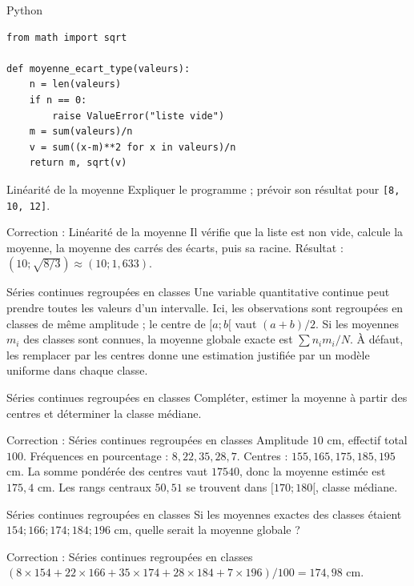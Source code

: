 \documentclass[aspectratio=169,10pt]{beamer}
\begin{document}
\begin{frame}[fragile]{Python}
\small
\begin{verbatim}
from math import sqrt

def moyenne_ecart_type(valeurs):
    n = len(valeurs)
    if n == 0:
        raise ValueError("liste vide")
    m = sum(valeurs)/n
    v = sum((x-m)**2 for x in valeurs)/n
    return m, sqrt(v)
\end{verbatim}
\end{frame}
\begin{frame}{Linéarité de la moyenne}
Expliquer le programme ; prévoir son résultat pour \texttt{[8, 10, 12]}.
\end{frame}
\begin{frame}{Correction : Linéarité de la moyenne}
Il vérifie que la liste est non vide, calcule la moyenne, la moyenne des carrés des écarts, puis sa racine. Résultat : \((10;\sqrt{8/3})\approx(10;1{,}633)\).
\end{frame}
\begin{frame}{Séries continues regroupées en classes}
Une variable quantitative continue peut prendre toutes les valeurs d'un intervalle. Ici, les observations sont regroupées en classes de même amplitude ; le centre de \([a;b[\) vaut \((a+b)/2\).
Si les moyennes \(m_i\) des classes sont connues, la moyenne globale exacte est \(\sum n_im_i/N\). À défaut, les remplacer par les centres donne une estimation justifiée par un modèle uniforme dans chaque classe.
\end{frame}
\begin{frame}{Séries continues regroupées en classes}
Compléter, estimer la moyenne à partir des centres et déterminer la classe médiane.
\end{frame}
\begin{frame}{Correction : Séries continues regroupées en classes}
Amplitude \(10\) cm, effectif total \(100\). Fréquences en pourcentage : \(8,22,35,28,7\). Centres : \(155,165,175,185,195\) cm. La somme pondérée des centres vaut \(17540\), donc la moyenne estimée est \(175{,}4\) cm. Les rangs centraux \(50,51\) se trouvent dans \([170;180[\), classe médiane.
\end{frame}
\begin{frame}{Séries continues regroupées en classes}
Si les moyennes exactes des classes étaient \(154;166;174;184;196\) cm, quelle serait la moyenne globale ?
\end{frame}
\begin{frame}{Correction : Séries continues regroupées en classes}
\((8\times154+22\times166+35\times174+28\times184+7\times196)/100=174{,}98\) cm.
\end{frame}
\end{document}
